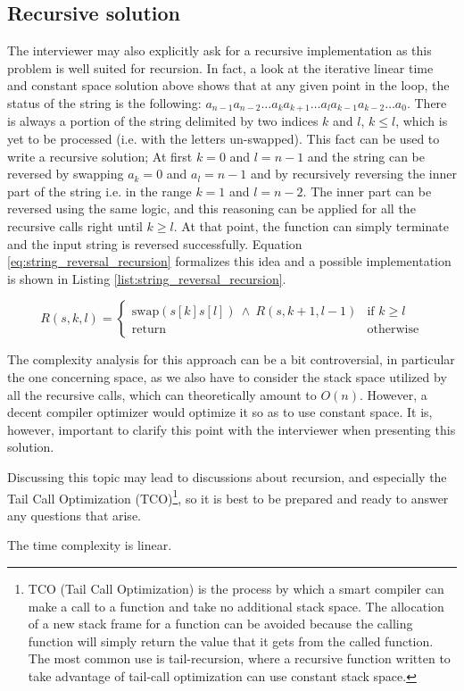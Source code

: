 \subsection{Recursive solution}
The interviewer may also explicitly ask for a recursive implementation as this problem is well suited for recursion. In fact, a look at the iterative linear time and constant space solution above shows that at any given point in the loop, the status of the string is the following: 
$a_{n-1}a_{n-2} \ldots a_k a_{k+1} \ldots a_l a_{k-1}a_{k-2} \ldots a_0$. 
There is always a portion of the string delimited by two indices $k$ and $l$, $k \leq l$, which is yet to be processed (i.e. with the letters un-swapped). 
This fact can be used to write a recursive solution;
At first $k=0$ and $l=n-1$ and the string can be reversed by swapping $a_k=0$ and $a_l=n-1$ and
by recursively reversing the inner part of the string i.e. in the range $k=1$ and $l=n-2$.
The inner part can be reversed using the same logic, and this reasoning can be applied for all the recursive calls right until $k \geq l$. At that point, the function can simply terminate and the input string is reversed successfully.
Equation \ref{eq:string_reversal_recursion} formalizes this idea and a possible implementation is shown in Listing \ref{list:string_reversal_recursion}.

\begin{equation}
	R(s, k, l)=
	\begin{cases} 
		\text{swap}(s[k]s[l]) \: \wedge \: R(s,k+1, l-1) & \text{if } k\geq l\\
		\text{return} & \text{otherwise}
	\end{cases}
\label{eq:string_reversal_recursion}
\end{equation} 





The complexity analysis for this approach can be a bit controversial, in particular the one concerning space, as we also have to consider
the stack space utilized by all the recursive calls, which can theoretically amount to $O(n)$. However, a decent compiler optimizer would optimize it so as to use constant space. 
It is, however,  important to clarify this point with the interviewer when presenting this solution. 

Discussing this topic may lead to discussions about recursion, and especially  the
Tail Call Optimization (TCO)\footnote{TCO (Tail Call Optimization) is the process by which a smart compiler can make a call to a function and take no additional stack space. The allocation of a new stack frame for a function can be avoided because the calling function will simply return the value that it gets from the called function. The most common use is tail-recursion, where a recursive function written to take advantage of tail-call optimization can	use constant stack space.}, so it is best to be prepared and ready to answer any questions that arise.

The time complexity is linear. 